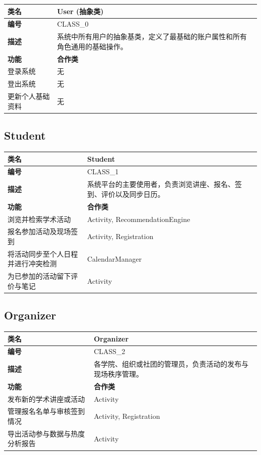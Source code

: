 \documentclass[UTF8,a4paper,12pt,fontset=none]{ctexrep}
\begin{document}
\begingroup
\small
\begin{longtable}{|>{\raggedright\arraybackslash}p{}|>{\raggedright\arraybackslash}p{}|}
\hline
\textbf{类名} & \textbf{User (抽象类)} \\
\hline
\textbf{编号} & CLASS\_0 \\
\hline
\textbf{描述} & 系统中所有用户的抽象基类，定义了最基础的账户属性和所有角色通用的基础操作。 \\
\hline
\textbf{功能} & \textbf{合作类} \\
\hline
登录系统 & 无 \\
\hline
登出系统 & 无 \\
\hline
更新个人基础资料 & 无 \\
\hline
\end{longtable}
\endgroup

\subsection{Student}

\begingroup
\small
\begin{longtable}{|>{\raggedright\arraybackslash}p{}|>{\raggedright\arraybackslash}p{}|}
\hline
\textbf{类名} & \textbf{Student} \\
\hline
\textbf{编号} & CLASS\_1 \\
\hline
\textbf{描述} & 系统平台的主要使用者，负责浏览讲座、报名、签到、评价以及同步日历。 \\
\hline
\textbf{功能} & \textbf{合作类} \\
\hline
浏览并检索学术活动 & Activity, RecommendationEngine \\
\hline
报名参加活动及现场签到 & Activity, Registration \\
\hline
将活动同步至个人日程并进行冲突检测 & CalendarManager \\
\hline
为已参加的活动留下评价与笔记 & Activity \\
\hline
\end{longtable}
\endgroup

\subsection{Organizer}

\begingroup
\small
\begin{longtable}{|>{\raggedright\arraybackslash}p{}|>{\raggedright\arraybackslash}p{}|}
\hline
\textbf{类名} & \textbf{Organizer} \\
\hline
\textbf{编号} & CLASS\_2 \\
\hline
\textbf{描述} & 各学院、组织或社团的管理员，负责活动的发布与现场秩序管理。 \\
\hline
\textbf{功能} & \textbf{合作类} \\
\hline
发布新的学术讲座或活动 & Activity \\
\hline
管理报名名单与审核签到情况 & Activity, Registration \\
\hline
导出活动参与数据与热度分析报告 & Activity \\
\hline
\end{longtable}
\endgroup
\end{document}
